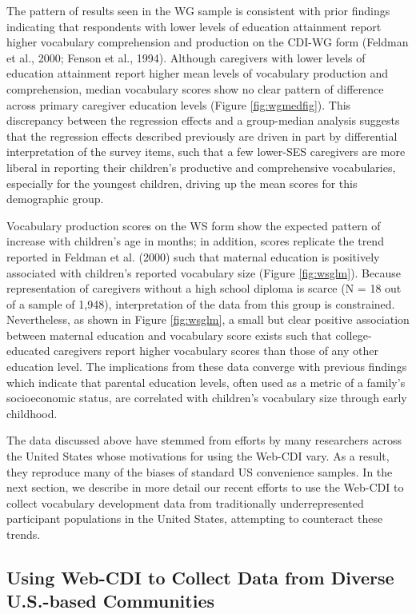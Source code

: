\documentclass[
  english,
  man]{apa7}
\begin{document}
The pattern of results seen in the WG sample is consistent with prior findings indicating that respondents with lower levels of education attainment report higher vocabulary comprehension and production on the CDI-WG form (Feldman et al., 2000; Fenson et al., 1994). Although caregivers with lower levels of education attainment report higher mean levels of vocabulary production and comprehension, median vocabulary scores show no clear pattern of difference across primary caregiver education levels (Figure \ref{fig:wgmedfig}). This discrepancy between the regression effects and a group-median analysis suggests that the regression effects described previously are driven in part by differential interpretation of the survey items, such that a few lower-SES caregivers are more liberal in reporting their children's productive and comprehensive vocabularies, especially for the youngest children, driving up the mean scores for this demographic group.

Vocabulary production scores on the WS form show the expected pattern of increase with children's age in months; in addition, scores replicate the trend reported in Feldman et al. (2000) such that maternal education is positively associated with children's reported vocabulary size (Figure \ref{fig:wsglm}). Because representation of caregivers without a high school diploma is scarce (N = 18 out of a sample of 1,948), interpretation of the data from this group is constrained. Nevertheless, as shown in Figure \ref{fig:wsglm}, a small but clear positive association between maternal education and vocabulary score exists such that college-educated caregivers report higher vocabulary scores than those of any other education level. The implications from these data converge with previous findings which indicate that parental education levels, often used as a metric of a family's socioeconomic status, are correlated with children's vocabulary size through early childhood.

The data discussed above have stemmed from efforts by many researchers across the United States whose motivations for using the Web-CDI vary. As a result, they reproduce many of the biases of standard US convenience samples. In the next section, we describe in more detail our recent efforts to use the Web-CDI to collect vocabulary development data from traditionally underrepresented participant populations in the United States, attempting to counteract these trends.

\hypertarget{using-web-cdi-to-collect-data-from-diverse-u.s.-based-communities}{%
\subsection{Using Web-CDI to Collect Data from Diverse U.S.-based Communities}\label{using-web-cdi-to-collect-data-from-diverse-u.s.-based-communities}}
\end{document}
